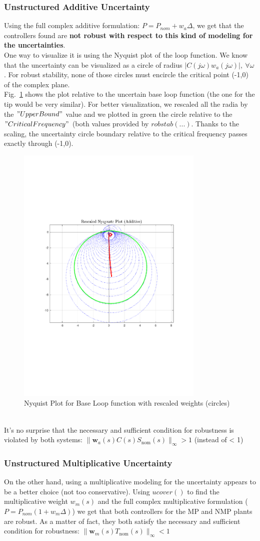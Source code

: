 \documentclass[a4paper, 12pt]{article}
\def\FigureEight{\centering\includegraphics[width=0.8\textwidth]{Figures/fig08.pdf}}
\begin{document}
\subsubsection{Unstructured Additive Uncertainty}
Using the full complex additive formulation: $P = P_{nom} + w_a \Delta$, we get that the controllers found are \textbf{not robust with respect to this kind of modeling for the uncertainties}.
\\
One way to visualize it is using the Nyquist plot of the loop function. We know that the uncertainty can be visualized as a circle of radius $|C(j\omega)w_a(j\omega)|,\ \forall \omega$. For robust stability, none of those circles must encircle the critical point (-1,0) of the complex plane. 
\\Fig.~\ref{fig:fig08} shows the plot relative to the uncertain base loop function (the one for the tip would be very similar). For better visualization, we rescaled all the radia by the $"UpperBound"$ value and we plotted in green the circle relative to the $"CriticalFrequency"$ (both values provided by $robstab(...)$. Thanks to the scaling, the uncertainty circle boundary relative to the critical frequency passes exactly through (-1,0).
\begin{figure}[h!]
    \FigureEight
    \caption{Nyquist Plot for Base Loop function with rescaled weights (circles)}
    \label{fig:fig08}
\end{figure}
\\It's no surprise that the necessary and sufficient condition for robustness is violated by both systems: $\|\mathbf{w}_a(s) C(s) S_{\text{nom}}(s)\|_\infty > 1$ (instead of < 1)
\subsubsection{Unstructured Multiplicative Uncertainty}
On the other hand, using a multiplicative modeling for the uncertainty appears to be a better choice (not too conservative). Using $ucover()$ to find the multiplicative weight $w_m(s)$  and the full complex multiplicative formulation ($P = P_{nom}(1 + w_m\Delta)$) we get that both controllers for the MP and NMP plants are robust.
As a matter of fact, they both satisfy the necessary and sufficient condition for robustness:
$\|\mathbf{w}_m(s) T_{\text{nom}}(s)\|_\infty < 1$
\end{document}
